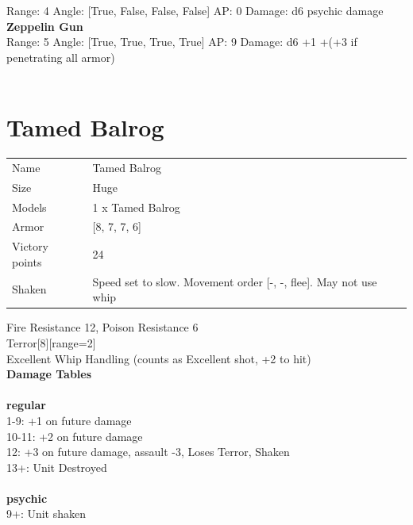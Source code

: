 Range: 4  Angle: [True, False, False, False] AP: 0 Damage: d6 psychic damage \\




{\bf Zeppelin Gun } \\



Range: 5  Angle: [True, True, True, True] AP: 9 Damage: d6 +1 +(+3 if penetrating all armor) \\




 
\ \\














\clearpage

\section{ Tamed Balrog }

\begin{tabular}{ll}
  Name & Tamed Balrog \\
  Size & Huge\\
  Models & 1 x Tamed Balrog\\
  Armor & [8, 7, 7, 6]\\
  Victory points & 24\\
  Shaken & Speed set to slow. Movement order [-, -, flee]. May not use whip\\
\end{tabular}

Fire Resistance 12, Poison Resistance 6\\ 
Terror[8][range=2]\\ 
Excellent Whip Handling (counts as Excellent shot, +2 to hit)\\ 



{\bf Damage Tables} \\
\ \\ {\bf regular } \\
1-9: +1 on future damage \\
10-11: +2 on future damage \\
12: +3 on future damage, assault -3, Loses Terror, Shaken \\
13+: Unit Destroyed \\
\ \\ {\bf psychic } \\
9+: Unit shaken \\


